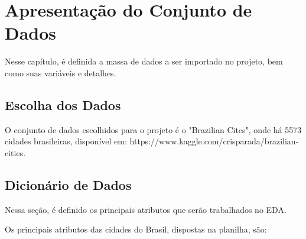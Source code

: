 \chapter{Apresentação do Conjunto de Dados}	

Nesse capítulo, é definida a massa de dados a ser importado no projeto, bem como suas variáveis e detalhes.

\section{Escolha dos Dados}

O conjunto de dados escolhidos para o projeto é o "Brazilian Cites", onde há 5573 cidades brasileiras, disponível em: https://www.kaggle.com/crisparada/brazilian-cities.

\section{Dicionário de Dados}

Nessa seção, é definido os principais atributos que serão trabalhados no EDA. 

Os principais atributos das cidades do Brasil, dispostas na planilha, são:


